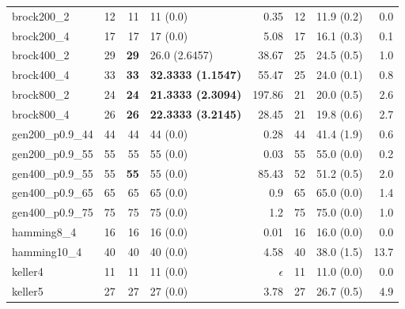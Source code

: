 \documentclass[conference]{IEEEtran}
\begin{document}
\begin{center}
\begin{table}[ht]
{\begin{tabular}{lr|rlr|rlr}
 brock200\_2       &           12  &           11  &  11 (0.0)                   &         0.35  &    12  &  11.9 (0.2)     &         0.0  \\
 brock200\_4       &           17  &           17  &  17 (0.0)                   &         5.08  &    17  &  16.1 (0.3)     &         0.1  \\
 brock400\_2       &           29  &  \textbf{29}  &  26.0 (2.6457)              &        38.67  &    25  &  24.5 (0.5)     &         1.0  \\
 brock400\_4       &           33  &  \textbf{33}  &  \textbf{32.3333 (1.1547)}  &        55.47  &    25  &  24.0 (0.1)     &         0.8  \\
 brock800\_2       &           24  &           \textbf{24}  &  \textbf{21.3333 (2.3094)}  &       197.86  &    21  &  20.0 (0.5)     &         2.6  \\
 brock800\_4       &           26  &           \textbf{26}  &  \textbf{22.3333 (3.2145)}  &        28.45  &    21  &  19.8 (0.6)     &         2.7  \\
 gen200\_p0.9\_44  &           44  &           44  &  44 (0.0)                   &         0.28  &    44  &  41.4 (1.9)     &         0.6  \\
 gen200\_p0.9\_55  &           55  &           55  &  55 (0.0)                   &         0.03  &    55  &  55.0 (0.0)     &         0.2  \\
 gen400\_p0.9\_55  &           55  &  \textbf{55}  &  55 (0.0)                   &        85.43  &    52  &  51.2 (0.5)     &         2.0  \\
 gen400\_p0.9\_65  &           65  &           65  &  65 (0.0)                   &          0.9  &    65  &  65.0 (0.0)     &         1.4  \\
 gen400\_p0.9\_75  &           75  &           75  &  75 (0.0)                   &          1.2  &    75  &  75.0 (0.0)     &         1.0  \\
 hamming8\_4       &           16  &           16  &  16 (0.0)                   &         0.01  &    16  &  16.0 (0.0)     &         0.0  \\
 hamming10\_4      &           40  &           40  &  40 (0.0)                   &         4.58  &    40  &  38.0 (1.5)     &        13.7  \\
 keller4           &           11  &           11  &  11 (0.0)                   &   $\epsilon$  &    11  &  11.0 (0.0)     &         0.0  \\
 keller5           &           27  &           27  &  27 (0.0)                   &         3.78  &    27  &  26.7 (0.5)     &         4.9  \\

\end{tabular}}
\end{table}
\end{center}
\end{document}
